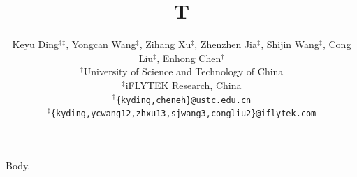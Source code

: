 \documentclass{article}
\begin{document}
\title{T}
\author{
Keyu Ding$^\dag$$^\ddag$,
Yongcan Wang$^\ddag$,
Zihang Xu$^\ddag$,
Zhenzhen Jia$^\ddag$,
Shijin Wang$^\ddag$,
Cong Liu$^\ddag$,
Enhong Chen$^\dag$
\\
{$^\dag$University of Science and Technology of China} \\
{$^\ddag$iFLYTEK Research, China} \\
$^\dag$\tt\{kyding,cheneh\}@ustc.edu.cn\\
$^\ddag$\tt\{kyding,ycwang12,zhxu13,sjwang3,congliu2\}@iflytek.com}
\maketitle
Body.
\end{document}
